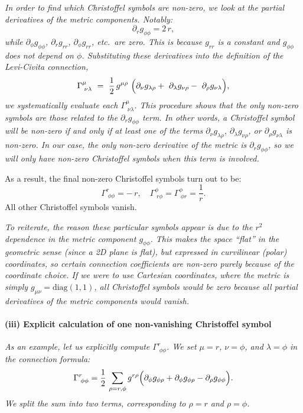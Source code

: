 \documentclass{article}
\begin{document}
\emph{In order to find which Christoffel symbols are non-zero, we look at the partial derivatives of the metric components. Notably:
\[
\partial_r g_{\phi\phi} = 2\,r, 
\]
while \(\partial_\phi g_{\phi\phi}\), \(\partial_r g_{rr}\), \(\partial_\phi g_{rr}\), etc.\ are zero. This is because \(g_{rr}\) is a constant and \(g_{\phi\phi}\) does not depend on \(\phi\). Substituting these derivatives into the definition of the Levi-Civita connection,
\[
\Gamma^\mu_{\;\nu\lambda} 
= 
\frac12\, g^{\mu\rho} 
\Bigl(
\partial_\nu g_{\lambda\rho}
+ 
\partial_\lambda g_{\nu\rho}
- 
\partial_\rho g_{\nu\lambda}
\Bigr),
\]
we systematically evaluate each \(\Gamma^\mu_{\;\nu\lambda}\). This procedure shows that the only non-zero symbols are those related to the \(\partial_r g_{\phi\phi}\) term. In other words, a Christoffel symbol will be non-zero if and only if at least one of the terms \(\partial_\nu g_{\lambda\rho}\), \(\partial_\lambda g_{\nu\rho}\), or \(\partial_\rho g_{\nu\lambda}\) is non-zero. In our case, the only non-zero derivative of the metric is \(\partial_r g_{\phi\phi}\), so we will only have non-zero Christoffel symbols when this term is involved.}

As a result, the final non-zero Christoffel symbols turn out to be:
\[
\Gamma^r_{\;\phi\phi} = -\,r,
\quad
\Gamma^\phi_{\;r\phi} = \Gamma^\phi_{\;\phi r} = \frac{1}{r}.
\]
All other Christoffel symbols vanish.

\emph{To reiterate, the reason these particular symbols appear is due to the \(r^2\) dependence in the metric component \(g_{\phi\phi}\). This makes the space “flat” in the geometric sense (since a 2D plane is flat), but expressed in curvilinear (polar) coordinates, so certain connection coefficients are non-zero purely because of the coordinate choice. If we were to use Cartesian coordinates, where the metric is simply \(g_{\mu\nu} = \text{diag}(1, 1)\), all Christoffel symbols would be zero because all partial derivatives of the metric components would vanish.}

\bigskip

\paragraph{(iii) Explicit calculation of one non-vanishing Christoffel symbol}

\emph{As an example, let us explicitly compute \(\Gamma^r_{\;\phi\phi}\). We set \(\mu = r\), \(\nu = \phi\), and \(\lambda = \phi\) in the connection formula:
\[
\Gamma^r_{\;\phi\phi}
=
\frac{1}{2}\,
\sum_{\rho = r,\phi}
g^{r\rho}
\Bigl(
\partial_\phi g_{\phi\rho}
+
\partial_\phi g_{\phi\rho}
-
\partial_\rho g_{\phi\phi}
\Bigr).
\]
We split the sum into two terms, corresponding to \(\rho = r\) and \(\rho = \phi\).}
\end{document}
